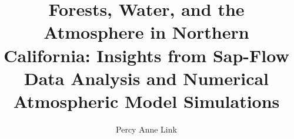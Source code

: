 \title{Forests, Water, and the Atmosphere in Northern California: Insights from Sap-Flow Data Analysis and Numerical Atmospheric Model Simulations}
\author{Percy Anne Link} %
